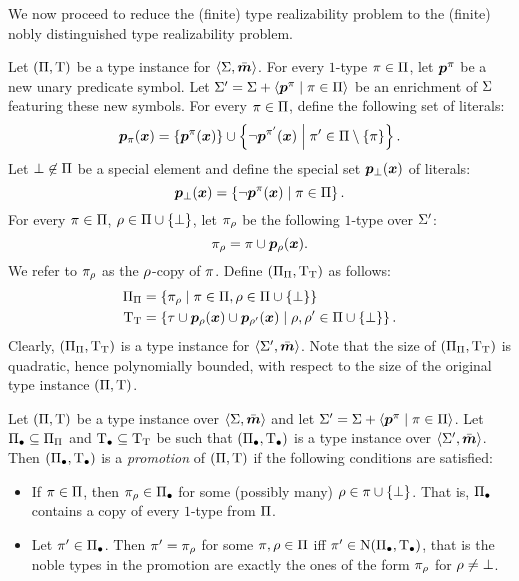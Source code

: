 We now proceed to reduce the (finite) type realizability problem to the (finite)
nobly distinguished type realizability problem.
\begin{definition}
Let $(\Pi,\mathrm{T})$ be a type instance for $\left\langle \mathrm{\Sigma},\bar{\bm{m}} \right\rangle$.
For every $1$-type $\pi \in \Pi$, let $\bm{p}^{\pi}$ be a new unary predicate
symbol. Let $\mathrm{\Sigma'} = \mathrm{\Sigma} + \left\langle \bm{p}^{\pi} \mathrel{}\middle|\mathrel{} \pi \in \Pi \right\rangle$ be an
enrichment of $\mathrm{\Sigma}$ featuring these new symbols. For every $\pi \in \Pi$,
define the following set of literals:
\[
  \bm{p}_{\pi}(\bm{x}) = \left\{\bm{p}^{\pi}(\bm{x})\right\} \cup
  \left\{\lnot\bm{p}^{{\pi'}}(\bm{x})\mathrel{}\middle|\mathrel{}{\pi'} \in \Pi \setminus \left\{\pi\right\}\right\}.
\]
Let $\bot \not\in \Pi$ be a special element and define the special set
$\bm{p}_{\bot}(\bm{x})$ of literals:
\[
  \bm{p}_{\bot}(\bm{x}) = 
  \left\{\lnot\bm{p}^{\pi}(\bm{x})\mathrel{}\middle|\mathrel{}\pi \in \Pi\right\}.
\]
For every $\pi \in \Pi$, $\rho \in \Pi\cup\left\{\bot\right\}$,
let ${\pi}_{\rho}$ be the following $1$-type over $\mathrm{\Sigma'}$:
\[
  {\pi}_{\rho} = \pi \cup \bm{p}_{\rho}(\bm{x}).
\]
We refer to ${\pi}_{\rho}$ as the $\rho$-copy of $\pi$.
Define $({\Pi}_{\Pi},{\mathrm{T}}_{\mathrm{T}})$ as follows:
\begin{align*}
  {\Pi}_{\Pi} &= 
  \left\{{\pi}_{\rho}\mathrel{}\middle|\mathrel{}\pi\in\Pi, \rho\in\Pi\cup\left\{\bot\right\}\right\} \\
  {\mathrm{T}}_{\mathrm{T}} &= \left\{\tau \cup \bm{p}_{\rho}(\bm{x}) \cup
  \bm{p}_{{\rho'}}(\bm{x})\mathrel{}\middle|\mathrel{}\rho,{\rho'} \in \Pi\cup\left\{\bot\right\}\right\}.
\end{align*}
Clearly, $({\Pi}_{\Pi},{\mathrm{T}}_{\mathrm{T}})$ is a type instance for
$\left\langle \mathrm{\Sigma'},\bar{\bm{m}} \right\rangle$.
Note that the size of $({\Pi}_{\Pi},{\mathrm{T}}_{\mathrm{T}})$ is quadratic, hence
polynomially bounded, with respect to the size of the original type instance
$(\Pi,\mathrm{T})$.
\end{definition}
\begin{definition}
Let $(\Pi,\mathrm{T})$ be a type instance over $\left\langle \mathrm{\Sigma},\bar{\bm{m}} \right\rangle$ and let
$\mathrm{\Sigma'} = \mathrm{\Sigma} + \left\langle \bm{p}^{\pi} \mathrel{}\middle|\mathrel{} \pi \in \Pi \right\rangle$.
Let $\Pi_{\bullet} \subseteq {\Pi}_{\Pi}$ and $\mathrm{T}_{\bullet} \subseteq {\mathrm{T}}_{\mathrm{T}}$ be
such that $(\Pi_{\bullet},\mathrm{T}_{\bullet})$ is a type instance over $\left\langle \mathrm{\Sigma'},\bar{\bm{m}} \right\rangle$.
Then $(\Pi_{\bullet},\mathrm{T}_{\bullet})$ is a \emph{promotion} of $(\Pi,\mathrm{T})$ if the
following conditions are satisfied:
\begin{itemize}
  \item[\condpromp]\label{cond:promp}
  If $\pi \in \Pi$, then ${\pi}_{\rho} \in \Pi_{\bullet}$
  for some (possibly many) $\rho \in \pi \cup \left\{\bot\right\}$. That is, $\Pi_{\bullet}$ contains a
  copy of every $1$-type from $\Pi$.
  \item[\condpromn]\label{cond:promn}
  Let ${\pi'} \in \Pi_{\bullet}$. Then ${\pi'} = {\pi}_{\rho}$ for
  some $\pi, \rho \in \Pi$ iff ${\pi'} \in \mathrm{\mathrm{N}}(\Pi_{\bullet},\mathrm{T}_{\bullet})$, that is the
  noble types in the promotion are exactly the ones of the form ${\pi}_{\rho}$
  for $\rho \neq \bot$.
\end{itemize}
\end{definition}

